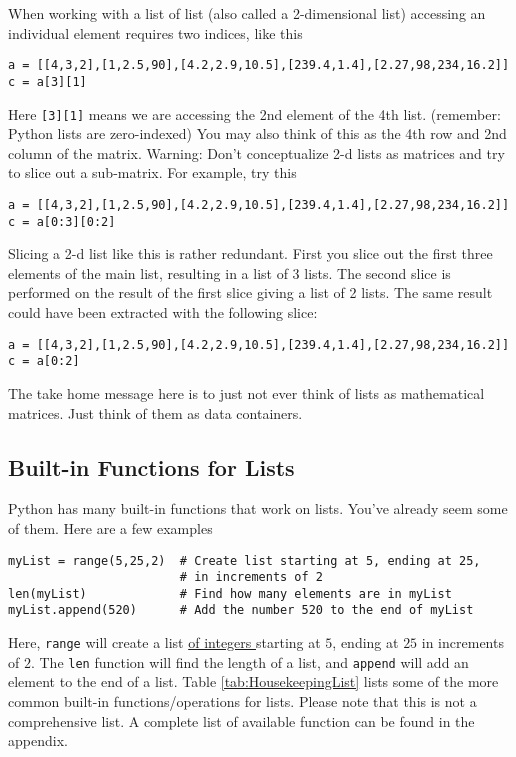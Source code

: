 When working with a list of list (also called a 2-dimensional list)
accessing an individual element requires two indices, like this
\begin{Verbatim}
a = [[4,3,2],[1,2.5,90],[4.2,2.9,10.5],[239.4,1.4],[2.27,98,234,16.2]]
c = a[3][1]  
\end{Verbatim}
Here \texttt{[3][1]} means we are accessing the 2nd element of the 4th
list. (remember: Python lists are zero-indexed) You may also think of
this as the 4th row and 2nd column of the matrix.  Warning: Don't
conceptualize 2-d lists as matrices and try to slice out a
sub-matrix.  For example, try this
\begin{Verbatim}
a = [[4,3,2],[1,2.5,90],[4.2,2.9,10.5],[239.4,1.4],[2.27,98,234,16.2]]
c = a[0:3][0:2]  
\end{Verbatim}
Slicing a 2-d list like this is rather redundant.  First you slice out
the first three elements of the main list, resulting in a list of 3
lists.  The second slice is performed on the result of the first
slice giving a list of 2 lists.  The same result could have been
extracted with the following slice:
\begin{Verbatim}
a = [[4,3,2],[1,2.5,90],[4.2,2.9,10.5],[239.4,1.4],[2.27,98,234,16.2]]
c = a[0:2]
\end{Verbatim}
The take home message here is to just not ever think of lists as
mathematical matrices.  Just think of them as data containers.
\subsection*{Built-in Functions for Lists}
Python has many built-in functions that work on lists.  You've already
seem some of them.  Here are a few examples
\begin{Verbatim}
myList = range(5,25,2)  # Create list starting at 5, ending at 25,
                        # in increments of 2  
len(myList)             # Find how many elements are in myList
myList.append(520)      # Add the number 520 to the end of myList
\end{Verbatim}
 Here, \texttt{range} will create a list \underline{of integers }
starting at $5$, ending at $25$ in increments of $2$.  The
\texttt{len} function will find the length of a list, and
\texttt{append} will add an element to the end of a list.  Table
\ref{tab:HousekeepingList} lists some of the more common built-in
functions/operations for lists.  Please note that this is not a
comprehensive list.  A complete list of available function can be
found in the appendix.


